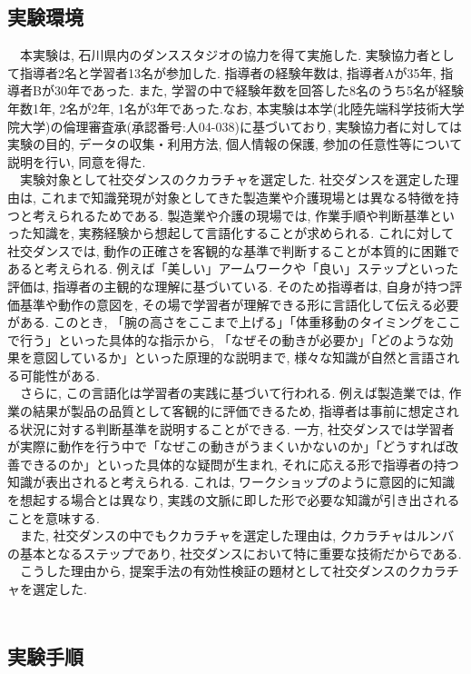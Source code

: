 \subsection{実験環境}
　本実験は, 石川県内のダンススタジオの協力を得て実施した. 実験協力者として指導者2名と学習者13名が参加した. 指導者の経験年数は, 指導者Aが35年, 指導者Bが30年であった. また, 学習の中で経験年数を回答した8名のうち5名が経験年数1年, 2名が2年, 1名が3年であった.なお, 本実験は本学(北陸先端科学技術大学院大学)の倫理審査承(承認番号:人04-038)に基づいており, 実験協力者に対しては実験の目的, データの収集・利用方法, 個人情報の保護, 参加の任意性等について説明を行い, 同意を得た. \\
　実験対象として社交ダンスのクカラチャを選定した. 社交ダンスを選定した理由は, これまで知識発現が対象としてきた製造業や介護現場とは異なる特徴を持つと考えられるためである. 製造業や介護の現場では, 作業手順や判断基準といった知識を, 実務経験から想起して言語化することが求められる. これに対して社交ダンスでは, 動作の正確さを客観的な基準で判断することが本質的に困難であると考えられる. 例えば「美しい」アームワークや「良い」ステップといった評価は, 指導者の主観的な理解に基づいている. そのため指導者は, 自身が持つ評価基準や動作の意図を, その場で学習者が理解できる形に言語化して伝える必要がある. このとき, 「腕の高さをここまで上げる」「体重移動のタイミングをここで行う」といった具体的な指示から, 「なぜその動きが必要か」「どのような効果を意図しているか」といった原理的な説明まで, 様々な知識が自然と言語される可能性がある. \\
　さらに, この言語化は学習者の実践に基づいて行われる. 例えば製造業では, 作業の結果が製品の品質として客観的に評価できるため, 指導者は事前に想定される状況に対する判断基準を説明することができる. 一方, 社交ダンスでは学習者が実際に動作を行う中で「なぜこの動きがうまくいかないのか」「どうすれば改善できるのか」といった具体的な疑問が生まれ, それに応える形で指導者の持つ知識が表出されると考えられる. これは, ワークショップのように意図的に知識を想起する場合とは異なり, 実践の文脈に即した形で必要な知識が引き出されることを意味する. \\
　また, 社交ダンスの中でもクカラチャを選定した理由は, クカラチャはルンバの基本となるステップであり, 社交ダンスにおいて特に重要な技術だからである. \\
　こうした理由から, 提案手法の有効性検証の題材として社交ダンスのクカラチャを選定した.\\
\\


\subsection{実験手順}
